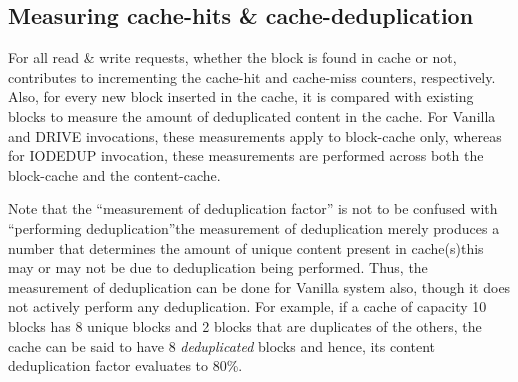\subsection{Measuring cache-hits \& cache-deduplication}
For all read \& write requests, whether the block is found in cache or 
not, contributes to incrementing the cache-hit and cache-miss counters,
respectively. Also, for every new block inserted in the cache, 
it is compared with existing blocks to measure the amount of deduplicated
content in the cache. 
For Vanilla and DRIVE invocations, these measurements apply
to block-cache only, whereas for IODEDUP invocation, these measurements
are performed across both the block-cache and the content-cache.

Note that the ``measurement of deduplication factor'' is not to be confused with
``performing deduplication''\textemdash{}the measurement of deduplication merely
produces a number that determines the amount of unique content present 
in cache(s)\textemdash{}this may or may not be due to deduplication being performed. 
Thus, the measurement of deduplication can be done for Vanilla system also,
though it does not actively perform any deduplication.
For example, if a cache of capacity 10 blocks has 8 unique blocks and 2 blocks that
are duplicates of the others, the cache can be said to have 8 
\textit{deduplicated} blocks and hence, its content deduplication factor 
evaluates to 80\%.
